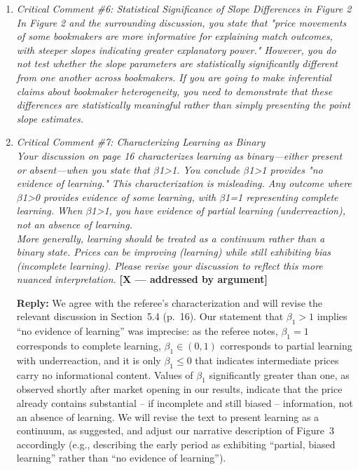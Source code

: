 \documentclass[letterpaper,12pt]{article}
\newcounter{b}
\newcommand{\argX}{\textcolor{green!55!black}{\textbf{[X --- addressed by argument]}}}
\newcommand{\Reply}[1]{\par\noindent\textbf{Reply:} #1}
\begin{document}
\begin{enumerate}
\item \textit{Critical Comment \#6: Statistical Significance of Slope Differences in Figure 2\\[6pt]
In Figure 2 and the surrounding discussion, you state that "price movements of some bookmakers are more informative for explaining match outcomes, with steeper slopes indicating greater explanatory power." However, you do not test whether the slope parameters are statistically significantly different from one another across bookmakers. If you are going to make inferential claims about bookmaker heterogeneity, you need to demonstrate that these differences are statistically meaningful rather than simply presenting the point slope estimates.}

\item \textit{Critical Comment \#7: Characterizing Learning as Binary\\[6pt]
Your discussion on page 16 characterizes learning as binary—either present or absent—when you state that $\beta$1>1.
You conclude $\beta$1>1 provides "no evidence of learning." This characterization is misleading. Any outcome where $\beta$1>0 provides evidence of some learning, with $\beta$1=1 representing complete learning. When $\beta$1>1, you have evidence of partial learning (underreaction), not an absence of learning.\\[6pt]
More generally, learning should be treated as a continuum rather than a binary state. Prices can be improving (learning) while still exhibiting bias (incomplete learning). Please revise your discussion to reflect this more nuanced interpretation.} \argX

\Reply{We agree with the referee's characterization and will revise the relevant discussion in Section~5.4 (p.~16). Our statement that $\beta_1 > 1$ implies ``no evidence of learning'' was imprecise: as the referee notes, $\beta_1 = 1$ corresponds to complete learning, $\beta_1 \in (0,1)$ corresponds to partial learning with underreaction, and it is only $\beta_1 \le 0$ that indicates intermediate prices carry no informational content. Values of $\beta_1$ significantly greater than one, as observed shortly after market opening in our results, indicate that the price already contains substantial -- if incomplete and still biased -- information, not an absence of learning. We will revise the text to present learning as a continuum, as suggested, and adjust our narrative description of Figure~3 accordingly (e.g., describing the early period as exhibiting ``partial, biased learning'' rather than ``no evidence of learning'').}


\end{enumerate}
\end{document}
